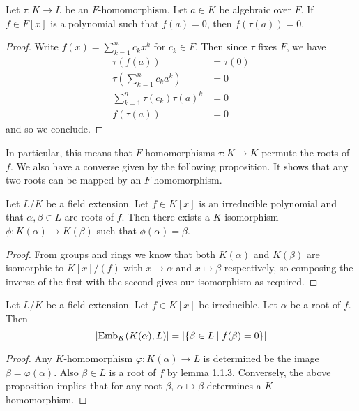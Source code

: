 \documentclass[a4paper]{article}
\begin{document}
\begin{lmm}{}{} Let $\tau:K\to L$ be an $F$-homomorphism. Let $a\in K$ be algebraic over $F$. If $f\in F[x]$ is a polynomial such that $f(a)=0$, then $f(\tau(a))=0$. 
\begin{proof}
Write $f(x)=\sum_{k=1}^nc_kx^k$ for $c_k\in F$. Then since $\tau$ fixes $F$, we have 
\begin{align*}
\tau(f(a))&=\tau(0)\\
\tau\left(\sum_{k=1}^nc_ka^k\right)&=0\\
\sum_{k=1}^n\tau(c_k)\tau(a)^k&=0\tag{$\tau$ is a field homomorphism}\\
f(\tau(a))&=0
\end{align*}
and so we conclude. 
\end{proof}
\end{lmm}

In particular, this means that $F$-homomorphisms $\tau:K\to K$ permute the roots of $f$. We also have a converse given by the following proposition. It shows that any two roots can be mapped by an $F$-homomorphism. 

\begin{prp}{}{} Let $L/K$ be a field extension. Let $f\in K[x]$ is an irreducible polynomial and that $\alpha,\beta\in L$ are roots of $f$. Then there exists a $K$-isomorphism $\phi:K(\alpha)\to K(\beta)$ such that $\phi(\alpha)=\beta$. 
\begin{proof}
From groups and rings we know that both $K(\alpha)$ and $K(\beta)$ are isomorphic to $K[x]/(f)$ with $x\mapsto\alpha$ and $x\mapsto\beta$ respectively, so composing the inverse of the first with the second gives our isomorphism as required. 
\end{proof}
\end{prp}

\begin{crl}{}{} Let $L/K$ be a field extension. Let $f\in K[x]$ be irreducible. Let $\alpha$ be a root of $f$. Then $$\abs{\text{Emb}_K(K(\alpha),L)}=\abs{\{\beta\in L\;|\;f(\beta)=0\}}$$ 
\begin{proof}
Any $K$-homomorphism $\varphi:K(\alpha)\to L$ is determined be the image $\beta=\varphi(\alpha)$. Also $\beta\in L$ is a root of $f$ by lemma 1.1.3. Conversely, the above proposition implies that for any root $\beta$, $\alpha\mapsto\beta$ determines a $K$-homomorphism. 
\end{proof}
\end{crl}
\end{document}
